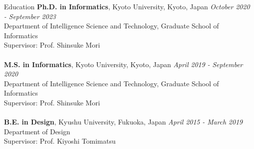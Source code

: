 \begin{rSection}{Education}
{\bf Ph.D. in Informatics}, Kyoto University, Kyoto, Japan \hfill {\em October 2020 - September 2023}
\\ Department of Intelligence Science and Technology, Graduate School of Informatics
\\Supervisor: Prof. Shinsuke Mori\\
\\{\bf M.S. in Informatics}, Kyoto University, Kyoto, Japan \hfill {\em April 2019 - September 2020} 
\\ Department of Intelligence Science and Technology, Graduate School of Informatics
\\ Supervisor: Prof. Shinsuke Mori\\
\\{\bf B.E. in Design}, Kyushu University, Fukuoka, Japan \hfill {\em April 2015 - March 2019}
\\ Department of Design
\\ Supervisor: Prof. Kiyoshi Tomimatsu
\end{rSection}